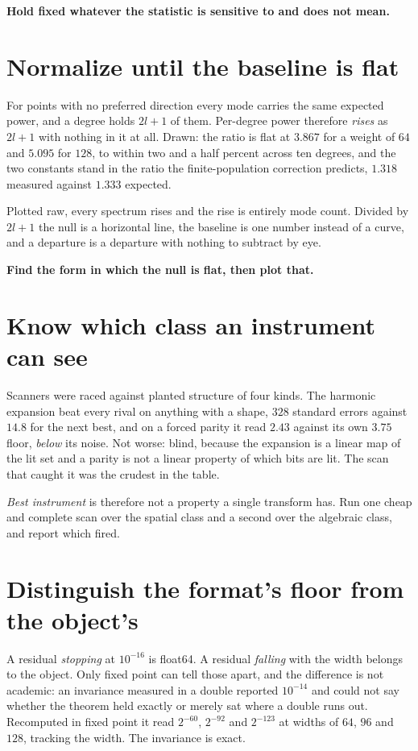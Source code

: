 \textbf{Hold fixed whatever the statistic is sensitive to and does not mean.}

\section{Normalize until the baseline is flat}

For points with no preferred direction every mode carries the same expected power, and a degree holds \(2l+1\) of them. Per-degree power therefore \emph{rises} as \(2l+1\) with nothing in it at all. Drawn: the ratio is flat at \(3.867\) for a weight of \(64\) and \(5.095\) for \(128\), to within two and a half percent across ten degrees, and the two constants stand in the ratio the finite-population correction predicts, \(1.318\) measured against \(1.333\) expected.

Plotted raw, every spectrum rises and the rise is entirely mode count. Divided by \(2l+1\) the null is a horizontal line, the baseline is one number instead of a curve, and a departure is a departure with nothing to subtract by eye.

\textbf{Find the form in which the null is flat, then plot that.}

\section{Know which class an instrument can see}

Scanners were raced against planted structure of four kinds. The harmonic expansion beat every rival on anything with a shape, \(328\) standard errors against \(14.8\) for the next best, and on a forced parity it read \(2.43\) against its own \(3.75\) floor, \emph{below} its noise. Not worse: blind, because the expansion is a linear map of the lit set and a parity is not a linear property of which bits are lit. The scan that caught it was the crudest in the table.

\emph{Best instrument} is therefore not a property a single transform has. Run one cheap and complete scan over the spatial class and a second over the algebraic class, and report which fired.

\section{Distinguish the format's floor from the object's}

A residual \emph{stopping} at \(10^{-16}\) is float64. A residual \emph{falling} with the width belongs to the object. Only fixed point can tell those apart, and the difference is not academic: an invariance measured in a double reported \(10^{-14}\) and could not say whether the theorem held exactly or merely sat where a double runs out. Recomputed in fixed point it read \(2^{-60}\), \(2^{-92}\) and \(2^{-123}\) at widths of \(64\), \(96\) and \(128\), tracking the width. The invariance is exact.


